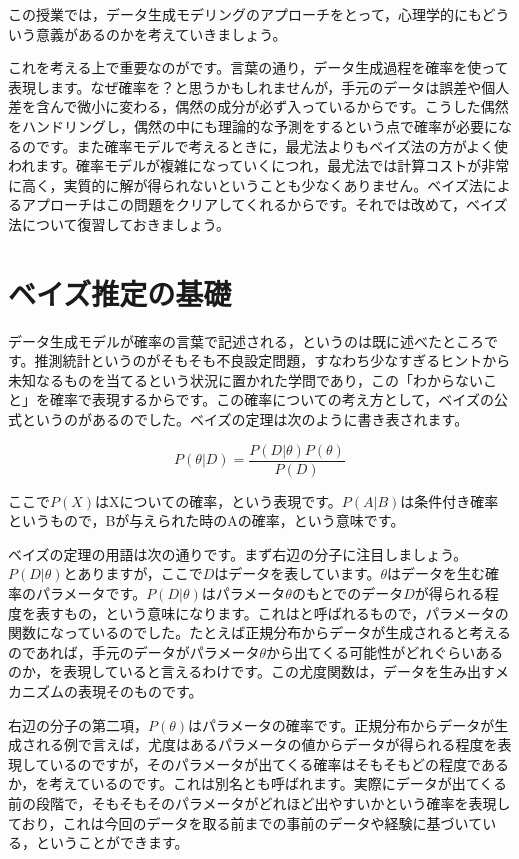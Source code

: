 \documentclass{ltjsbook}
\begin{document}
この授業では，データ生成モデリングのアプローチをとって，心理学的にもどういう意義があるのかを考えていきましょう。

これを考える上で重要なのがです。言葉の通り，データ生成過程を確率を使って表現します。なぜ確率を？と思うかもしれませんが，手元のデータは誤差や個人差を含んで微小に変わる，偶然の成分が必ず入っているからです。こうした偶然をハンドリングし，偶然の中にも理論的な予測をするという点で確率が必要になるのです。また確率モデルで考えるときに，最尤法よりもベイズ法の方がよく使われます。確率モデルが複雑になっていくにつれ，最尤法では計算コストが非常に高く，実質的に解が得られないということも少なくありません。ベイズ法によるアプローチはこの問題をクリアしてくれるからです。それでは改めて，ベイズ法について復習しておきましょう。

\section{ベイズ推定の基礎}

データ生成モデルが確率の言葉で記述される，というのは既に述べたところです。推測統計というのがそもそも不良設定問題，すなわち少なすぎるヒントから未知なるものを当てるという状況に置かれた学問であり，この「わからないこと」を確率で表現するからです。この確率についての考え方として，ベイズの公式というのがあるのでした。ベイズの定理は次のように書き表されます。

$$ P(\theta|D) = \frac{P(D|\theta)P(\theta)}{P(D)} $$

ここで$P(X)$はXについての確率，という表現です。$P(A|B)$は条件付き確率というもので，Bが与えられた時のAの確率，という意味です。

ベイズの定理の用語は次の通りです。まず右辺の分子に注目しましょう。$P(D|\theta)$とありますが，ここで$D$はデータを表しています。$\theta$はデータを生む確率のパラメータです。$P(D|\theta)$はパラメータ$\theta$のもとでのデータ$D$が得られる程度を表すもの，という意味になります。これはと呼ばれるもので，パラメータの関数になっているのでした。たとえば正規分布からデータが生成されると考えるのであれば，手元のデータがパラメータ$\theta$から出てくる可能性がどれぐらいあるのか，を表現していると言えるわけです。この尤度関数は，データを生み出すメカニズムの表現そのものです。

右辺の分子の第二項，$P(\theta)$はパラメータの確率です。正規分布からデータが生成される例で言えば，尤度はあるパラメータの値からデータが得られる程度を表現しているのですが，そのパラメータが出てくる確率はそもそもどの程度であるか，を考えているのです。これは別名とも呼ばれます。実際にデータが出てくる前の段階で，そもそもそのパラメータがどれほど出やすいかという確率を表現しており，これは今回のデータを取る前までの事前のデータや経験に基づいている，ということができます。
\end{document}

